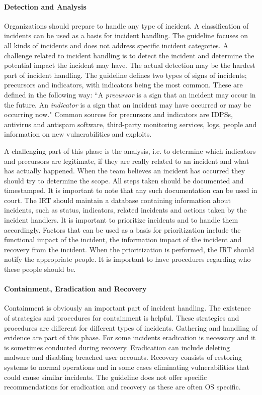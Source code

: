 \paragraph{Detection and Analysis}
Organizations should prepare to handle any type of incident. A classification of incidents can be used as a basis for incident handling. The guideline focuses on all kinds of incidents and does not address specific incident categories. A challenge related to incident handling is to detect the incident and determine the potential impact the incident may have. The actual detection may be the hardest part of incident handling. The guideline defines two types of signs of incidents; precursors and indicators, with indicators being the most common. These are defined in the following way: ``A \emph{precursor} is a sign that an incident may occur in the future. An \emph{indicator} is a sign that an incident may have occurred or may be occurring now." Common sources for precursors and indicators are \acp{IDPS}, antivirus and antispam software, third-party monitoring services, logs, people and information on new vulnerabilities and exploits. 

A challenging part of this phase is the analysis, i.e. to determine which indicators and precursors are legitimate, if they are really related to an incident and what has actually happened. When the team believes an incident has occurred they should try to determine the scope. All steps taken should be documented and timestamped. It is important to note that any such documentation can be used in court. The \ac{IRT} should maintain a database containing information about incidents, such as status, indicators, related incidents and actions taken by the incident handlers. It is important to prioritize incidents and to handle them accordingly. Factors that can be used as a basis for prioritization include the functional impact of the incident, the information impact of the incident and recovery from the incident. When the prioritization is performed, the \ac{IRT} should notify the appropriate people. It is important to have procedures regarding who these people should be.

\paragraph{Containment, Eradication and Recovery}
Containment is obviously an important part of incident handling. The existence of strategies and procedures for containment is helpful. These strategies and procedures are different for different types of incidents. Gathering and handling of evidence are part of this phase. For some incidents eradication is necessary and it is sometimes conducted during recovery. Eradication can include deleting malware and disabling breached user accounts. Recovery consists of restoring systems to normal operations and in some cases eliminating vulnerabilities that could cause similar incidents. The guideline does not offer specific recommendations for eradication and recovery as these are often OS specific. 

